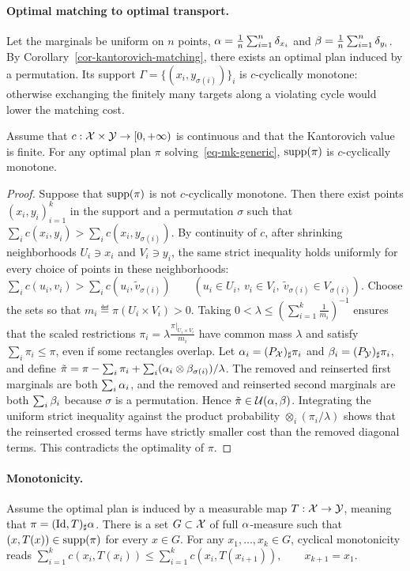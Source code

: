 \paragraph{Optimal matching to optimal transport.}
Let the marginals be uniform on $n$ points, $\alpha=\frac1n\sum_{i=1}^n\delta_{x_i}$ and $\beta=\frac1n\sum_{i=1}^n\delta_{y_i}$. By Corollary~\ref{cor-kantorovich-matching}, there exists an optimal plan induced by a permutation. Its support $\Gamma=\{(x_i,y_{\sigma(i)})\}_i$ is $c$-cyclically monotone: otherwise exchanging the finitely many targets along a violating cycle would lower the matching cost.

\begin{thm}\label{thm:opt_ccm}
Assume that $c:\mathcal{X}\times\mathcal{Y}\to[0,+\infty)$ is continuous and that the Kantorovich value is finite. For any optimal plan $\pi$ solving~\eqref{eq-mk-generic}, $\operatorname{supp}(\pi)$ is $c$-cyclically monotone.
\end{thm}
\begin{proof}
Suppose that $\operatorname{supp}(\pi)$ is not $c$-cyclically monotone. Then there exist points $(x_i,y_i)_{i=1}^k$ in the support and a permutation $\sigma$ such that $\sum_i c(x_i,y_i)>\sum_i c(x_i,y_{\sigma(i)})$.
By continuity of $c$, after shrinking neighborhoods $U_i\ni x_i$ and $V_i\ni y_i$, the same strict inequality holds uniformly for every choice of points in these neighborhoods:
\(\sum_i c(u_i,v_i) > \sum_i c(u_i,\tilde v_{\sigma(i)}) \qquad (u_i\in U_i,\ v_i\in V_i,\ \tilde v_{\sigma(i)}\in V_{\sigma(i)}).\)
Choose the sets so that $m_i\eqdef\pi(U_i\times V_i)>0$. Taking
\(0<\lambda\leq\left(\sum_{i=1}^k\frac1{m_i}\right)^{-1}\)
ensures that the scaled restrictions
\(\pi_i=\lambda\frac{\pi|_{U_i\times V_i}}{m_i}\)
have common mass $\lambda$ and satisfy $\sum_i\pi_i\leq\pi$, even if some rectangles overlap. Let $\alpha_i=(P_{\mathcal{X}})_\sharp\pi_i$ and $\beta_i=(P_{\mathcal{Y}})_\sharp\pi_i$, and define $\tilde\pi=\pi-\sum_i\pi_i+\sum_i(\alpha_i\otimes\beta_{\sigma(i)})/\lambda$.
The removed and reinserted first marginals are both $\sum_i\alpha_i$, and the removed and reinserted second marginals are both $\sum_i\beta_i$ because $\sigma$ is a permutation. Hence $\tilde\pi\in\mathcal{U}(\alpha,\beta)$. Integrating the uniform strict inequality against the product probability $\otimes_i(\pi_i/\lambda)$ shows that the reinserted crossed terms have strictly smaller cost than the removed diagonal terms. This contradicts the optimality of $\pi$.
\end{proof}
\paragraph{Monotonicity.}
Assume the optimal plan is induced by a measurable map $T:\mathcal{X}\to\mathcal{Y}$, meaning that $\pi=(\mathrm{Id},T)_\sharp\alpha$. There is a set $G\subset\mathcal{X}$ of full $\alpha$-measure such that $(x,T(x))\in\operatorname{supp}(\pi)$ for every $x\in G$. For any $x_1,\ldots,x_k\in G$, cyclical monotonicity reads
\(\sum_{i=1}^k c(x_i,T(x_i)) \leq \sum_{i=1}^k c(x_i,T(x_{i+1})), \qquad x_{k+1}=x_1.\)
